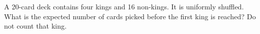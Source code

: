 A 20-card deck contains four kings and 16 non-kings. It is uniformly shuffled. What is the expected number of cards picked before the first king is reached? Do not count that king.
